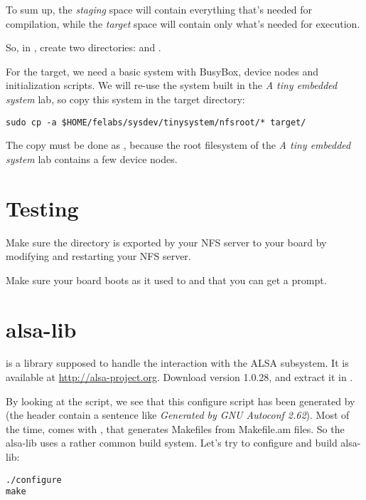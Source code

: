 To sum up, the {\em staging} space will contain everything that's
needed for compilation, while the {\em target} space will contain only
what's needed for execution.

So, in , create two directories:
 and .

For the target, we need a basic system with BusyBox, device nodes and
initialization scripts. We will re-use the system built in the {\em A
  tiny embedded system} lab, so copy this system in the target
directory:

\begin{verbatim}
sudo cp -a $HOME/felabs/sysdev/tinysystem/nfsroot/* target/
\end{verbatim}

The copy must be done as , because the root filesystem of
the {\em A tiny embedded system} lab contains a few device nodes.

\section{Testing}

Make sure the  directory is exported by your NFS server
to your board by modifying  and restarting your NFS
server.

Make sure your board boots as it used to and that you can get a
prompt.

\section{alsa-lib}

 is a library supposed to handle the interaction with
the ALSA subsystem. It is available at
\url{http://alsa-project.org}. Download version 1.0.28, and extract it
in .

By looking at the  script, we see that this configure
script has been generated by  (the header contain a
sentence like {\em Generated by GNU Autoconf 2.62}). Most of the time,
 comes with , that generates Makefiles
from Makefile.am files. So the alsa-lib uses a rather common build
system. Let's try to configure and build alsa-lib:

\begin{verbatim}
./configure
make
\end{verbatim}


